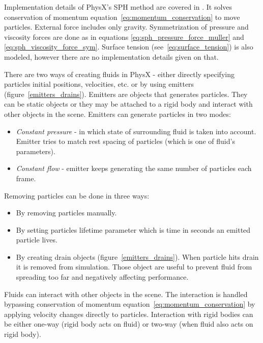 Implementation details of PhysX's SPH method are covered in \cite{Harris08}. It solves conservation of momentum equation~\ref{eq:momentum_conservation} to move particles. External force includes only gravity. Symmetrization of pressure and viscosity forces are done as in equations \ref{eq:sph_pressure_force_muller} and \ref{eq:sph_viscosity_force_sym}. Surface tension (see~\ref{eq:surface_tension}) is also modeled, however there are no implementation details given on that.

There are two ways of creating fluids in PhysX - either directly specifying particles initial positions, velocities, etc. or by using emitters (figure~\ref{emitters_drains}). Emitters are objects that generates particles. They can be static objects or they may be attached to a rigid body and interact with other objects in the scene. Emitters can generate particles in two modes:
\begin{itemize}\itemsep2pt
\item \textit{Constant pressure} - in which state of surrounding fluid is taken into account. Emitter tries to match rest spacing of particles (which is one of fluid's parameters). 
\item \textit{Constant flow} - emitter keeps generating the same number of particles each frame. 
\end{itemize}


Removing particles can be done in three ways:
\begin{itemize}\itemsep2pt
\item By removing particles manually.
\item By setting particles lifetime parameter which is time in seconds an emitted particle lives.
\item By creating drain objects (figure~\ref{emitters_drains}). When particle hits drain it is removed from simulation. Those object are useful to prevent fluid from spreading too far and negatively affecting performance.
\end{itemize}

Fluids can interact with other objects in the scene. The interaction is handled bypassing conservation of momentum equation~\ref{eq:momentum_conservation} by applying velocity changes directly to particles. Interaction with rigid bodies can be either one-way (rigid body acts on fluid) or two-way (when fluid also acts on rigid body).


